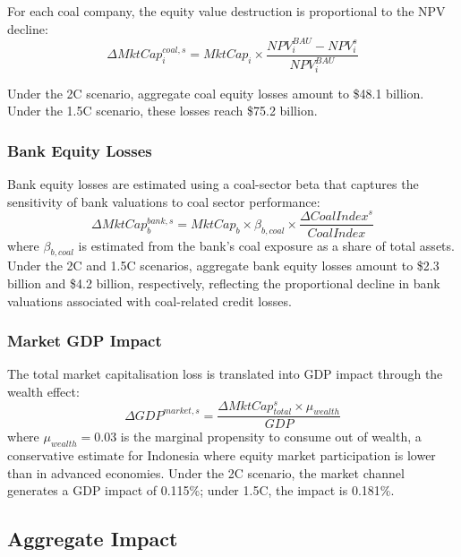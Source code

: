 For each coal company, the equity value destruction is proportional to the NPV decline:
\begin{equation}
\label{eq:coal_mktcap}
\Delta MktCap_i^{coal,s} = MktCap_i \times \frac{NPV_i^{BAU} - NPV_i^s}{NPV_i^{BAU}}
\end{equation}

Under the 2\textdegree C scenario, aggregate coal equity losses amount to \$48.1 billion. Under the 1.5\textdegree C scenario, these losses reach \$75.2 billion.

\subsubsection{Bank Equity Losses}

Bank equity losses are estimated using a coal-sector beta that captures the sensitivity of bank valuations to coal sector performance:
\begin{equation}
\label{eq:bank_mktcap}
\Delta MktCap_b^{bank,s} = MktCap_b \times \beta_{b,coal} \times \frac{\Delta CoalIndex^s}{CoalIndex}
\end{equation}
where $\beta_{b,coal}$ is estimated from the bank's coal exposure as a share of total assets. Under the 2\textdegree C and 1.5\textdegree C scenarios, aggregate bank equity losses amount to \$2.3 billion and \$4.2 billion, respectively, reflecting the proportional decline in bank valuations associated with coal-related credit losses.

\subsubsection{Market GDP Impact}

The total market capitalisation loss is translated into GDP impact through the wealth effect:
\begin{equation}
\label{eq:market_gdp}
\Delta GDP^{market,s} = \frac{\Delta MktCap_{total}^s \times \mu_{wealth}}{GDP}
\end{equation}
where $\mu_{wealth} = 0.03$ is the marginal propensity to consume out of wealth, a conservative estimate for Indonesia where equity market participation is lower than in advanced economies. Under the 2\textdegree C scenario, the market channel generates a GDP impact of 0.115\%; under 1.5\textdegree C, the impact is 0.181\%.

\subsection{Aggregate Impact}
\label{subsec:aggregate_impact}


